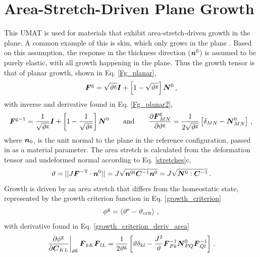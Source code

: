 \documentclass[10pt,letterpaper,oneside]{report}
\newcommand{\ten}[1]{\mbox{\boldmath $#1$}{}}
\newcommand{\scas}[1]{\mbox{{\scriptsize{${\rm{#1}}$}}}{}}
\begin{document}
\section{Area-Stretch-Driven Plane Growth}

This UMAT is used for materials that exhibit area-stretch-driven growth in the plane.  A common example of this is skin, which only grows in the plane \cite{BuganzaTepole2011, Zollner2013}.  Based on this assumption, the response in the thickness direction ($\ten{n}^0$) is assumed to be purely elastic, with all growth happening in the plane.  Thus the growth tensor is that of planar growth, shown in Eq. \ref{Fg_planar},
\begin{equation*}
\ten{F}^{\scas{g}} = \sqrt{\vartheta^{\scas{g}}} \ten{I} + \left[1-\sqrt{\vartheta^{\scas{g}}} \right] \ten{N}^0 \, , 
\end{equation*}
with inverse and derivative found in Eq. \ref{Fg_planar2},
\begin{equation*}
\ten{F}^{\scas{g}-1} = \frac{1}{\sqrt{\vartheta^{\scas{g}}}} \ten{I} + \left[1-\frac{1}{\sqrt{\vartheta^{\scas{g}}}} \right] \ten{N}^0 
\qquad \mbox{and} \qquad
\frac{\partial \ten{F}^{\scas{g}}_{MN} }{\partial \vartheta^{\scas{g}}} = \frac{1}{2\sqrt{\vartheta^{\scas{g}}}} \left[ \delta_{MN} - \ten{N}^0_{MN} \right] \, ,
\end{equation*}
where $\ten{n}_0$, is the unit normal to the plane in the reference configuration, passed in as a material parameter.
The area stretch is calculated from the deformation tensor and undeformed normal according to Eq. \ref{stretches}c,
\begin{equation*}
\vartheta = \vert\vert J \ten{F}^{-\scas{T}} \cdot \ten{n}^0 \vert\vert = J \sqrt{\ten{n}^{0 \scas{t}} \ten{C}^{-1} \ten{n}^0} = J \sqrt{\ten{N}^0 :  \ten{C}^{-1} } \, . 
\end{equation*}
Growth is driven by an area stretch that differs from the homeostatic state, represented by the growth criterion function in Eq. \ref{growth_criterion}
\begin{equation*}
\phi^{\scas{g}} = \left\langle \vartheta^{\scas{e}} - \vartheta_{\scas{crit}} \right\rangle \, ,
\end{equation*}
with derivative found in Eq. \ref{growth_criterion_deriv_area}
\begin{equation*}
\left. \frac{ \partial \phi^{\scas{g}} }{ \partial \ten{C}_{KL} } \right|_{\vartheta^{\scas{g}}} \ten{F}_{kK} \ten{F}_{lL} 
= \frac{1}{2 \vartheta^{\scas{g}}} \left[ \vartheta \delta_{kl} - \frac{J^2}{\vartheta} \ten{F}^{-1}_{Pk} \ten{N}^0_{PQ} \ten{F}^{-1}_{Ql} \right] \, .
\end{equation*}
\end{document}
